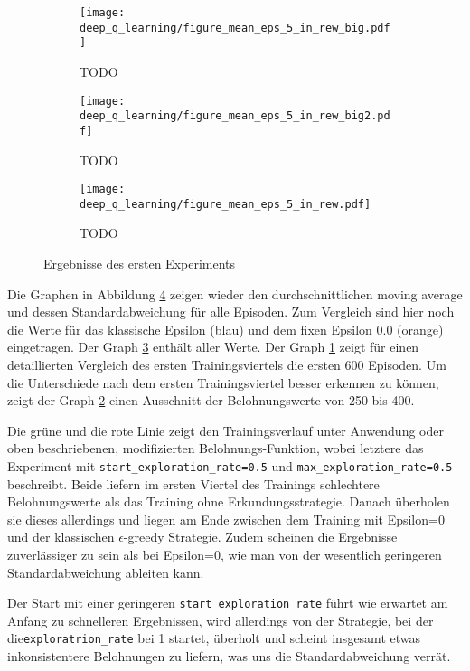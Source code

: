 \begin{figure}[h!]
    \centering
    \begin{subfigure}[b]{0.49\textwidth}
        \texttt{[image: deep\_q\_learning/figure\_mean\_eps\_5\_in\_rew\_big.pdf]}
        \caption{TODO}
        \label{img:graphEps5InRewBig}
    \end{subfigure}
    \begin{subfigure}[b]{0.49\textwidth}
        \texttt{[image: deep\_q\_learning/figure\_mean\_eps\_5\_in\_rew\_big2.pdf]}
        \caption{TODO}
        \label{img:graphEps5InRewBig2}
    \end{subfigure}
    \begin{subfigure}[b]{0.7\textwidth}
        \texttt{[image: deep\_q\_learning/figure\_mean\_eps\_5\_in\_rew.pdf]}
        \caption{TODO}
        \label{img:graphEps5InRew}
    \end{subfigure}
    \caption{Ergebnisse des ersten Experiments}
    \label{img:graphEps5InRewBoth}
\end{figure} 

Die Graphen in Abbildung \ref{img:graphEps5InRewBoth} zeigen wieder den durchschnittlichen moving average und dessen Standardabweichung für alle Episoden. Zum Vergleich sind hier noch die Werte für das klassische Epsilon (blau) und dem fixen Epsilon 0.0 (orange) eingetragen. Der Graph \ref{img:graphEps5InRew} enthält aller Werte. Der Graph \ref{img:graphEps5InRewBig} zeigt für einen detaillierten Vergleich des ersten Trainingsviertels die ersten 600 Episoden. Um die Unterschiede nach dem ersten Trainingsviertel besser erkennen zu können, zeigt der Graph \ref{img:graphEps5InRewBig2} einen Ausschnitt der Belohnungswerte von 250 bis 400.

Die grüne und die rote Linie zeigt den Trainingsverlauf unter Anwendung oder oben beschriebenen, modifizierten Belohnungs-Funktion, wobei letztere das Experiment mit \texttt{start_exploration_rate=0.5} und \texttt{max_exploration_rate=0.5} beschreibt. Beide liefern im ersten Viertel des Trainings schlechtere Belohnungswerte als das Training ohne Erkundungsstrategie. Danach überholen sie dieses allerdings und liegen am Ende zwischen dem Training mit Epsilon=0 und der klassischen $ \epsilon $-greedy Strategie. Zudem scheinen die Ergebnisse zuverlässiger zu sein als bei Epsilon=0, wie man von der wesentlich geringeren Standardabweichung ableiten kann.

Der Start mit einer geringeren \texttt{start_exploration_rate} führt wie erwartet am Anfang zu schnelleren Ergebnissen, wird allerdings von der Strategie, bei der die\linebreak\texttt{exploratrion_rate} bei 1 startet, überholt und scheint insgesamt etwas inkonsistentere Belohnungen zu liefern, was uns die Standardabweichung verrät.

